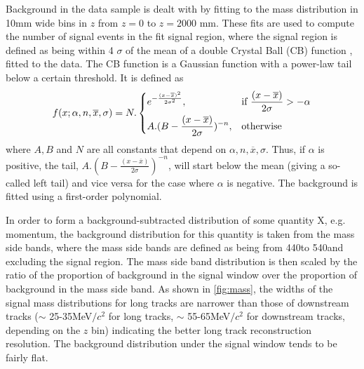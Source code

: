 Background in the data sample is dealt with by fitting to the \KS mass distribution in 10mm wide bins in $z$ from $z = 0$ to $z = 2000$ mm.  These fits are used to compute the number of signal events in the fit signal region, where the signal region is defined as being within 4 $\sigma$ of the mean of a double Crystal Ball (\Gls{CB}) function \cite{Skwarnicki:1986xj}, fitted to the data. The CB function is a Gaussian function with a power-law tail below a certain threshold. It is defined as
\begin{equation}
  f(x; \alpha,n,\overline{x},\sigma) = N.
  \begin{dcases}
    e^{-\frac{(x-\overline{x})^{2}}{2\sigma^{2}}},& \text{if } \frac{(x-\overline{x})}{2\sigma}  >-\alpha\\
    A.(B - \frac{(x-\overline{x})}{2\sigma})^{-n}, & \text{otherwise}
  \end{dcases}
  \label{Eq:CB}
\end{equation}
where $A, B$ and $N$ are all constants that depend on ${\alpha,n,\overline{x},\sigma}$. Thus, if $\alpha$ is positive, the tail, $A.(B - \frac{(x-\overline{x})}{2\sigma})^{-n}$, will start below the mean (giving a so-called left tail) and vice versa for the case where $\alpha$ is negative. The background is fitted using a first-order polynomial. %

In order to form a background-subtracted distribution of some quantity X, e.g. momentum, the background distribution for this quantity is taken from the mass side bands, where the mass side bands are defined as being from 440\mevcc to 540\mevcc and excluding the signal region. The mass side band distribution is then scaled by the ratio of the proportion of background in the signal window over the proportion of background in the mass side band. As shown in \autoref{fig:mass}, the widths of the signal mass distributions for long tracks are narrower than those of downstream tracks ($\sim$ 25-35\:MeV$/c^{2}$ for long tracks, $\sim$ 55-65\:MeV$/c^{2}$ for downstream tracks, depending on the $z$ bin) indicating the better long track reconstruction resolution. The background distribution under the signal window tends to be fairly flat. %

